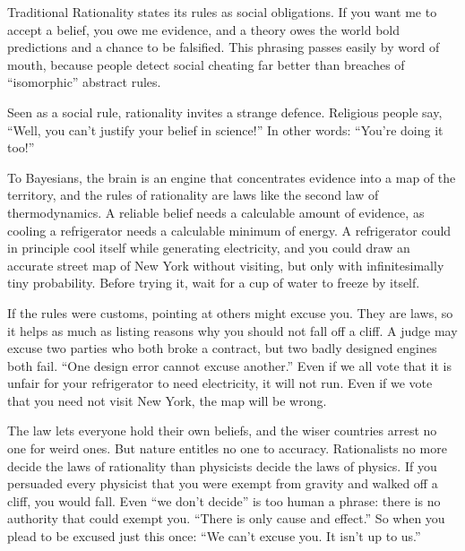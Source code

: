 
Traditional Rationality states its rules as social obligations. If you want me to accept a belief, you owe me evidence, and a theory owes the world bold predictions and a chance to be falsified.  This phrasing passes easily by word of mouth, because people detect social cheating far better than breaches of ``isomorphic'' abstract rules. 

Seen as a social rule, rationality invites a strange defence. Religious people say, ``Well, you can't justify your belief in science!'' In other words: ``You're doing it too!'' 

To Bayesians, the brain is an engine that concentrates evidence into a map of the territory, and the rules of rationality are laws like the second law of thermodynamics. A reliable belief needs a calculable amount of evidence, as cooling a refrigerator needs a calculable minimum of energy. A refrigerator could in principle cool itself while generating electricity, and you could draw an accurate street map of New York without visiting, but only with infinitesimally tiny probability.  Before trying it, wait for a cup of water to freeze by itself.

If the rules were customs, pointing at others might excuse you. They are laws, so it helps as much as listing reasons why you should not fall off a cliff. A judge may excuse two parties who both broke a contract, but two badly designed engines both fail. ``One design error cannot excuse another.'' Even if we all vote that it is unfair for your refrigerator to need electricity, it will not run. Even if we vote that you need not visit New York, the map will be wrong.

The law lets everyone hold their own beliefs, and the wiser countries arrest no one for weird ones. But nature entitles no one to accuracy. Rationalists no more decide the laws of rationality than physicists decide the laws of physics. If you persuaded every physicist that you were exempt from gravity and walked off a cliff, you would fall. Even ``we don't decide'' is too human a phrase: there is no authority that could exempt you. ``There is only cause and effect.'' So when you plead to be excused just this once: ``We can't excuse you. It isn't up to us.''
